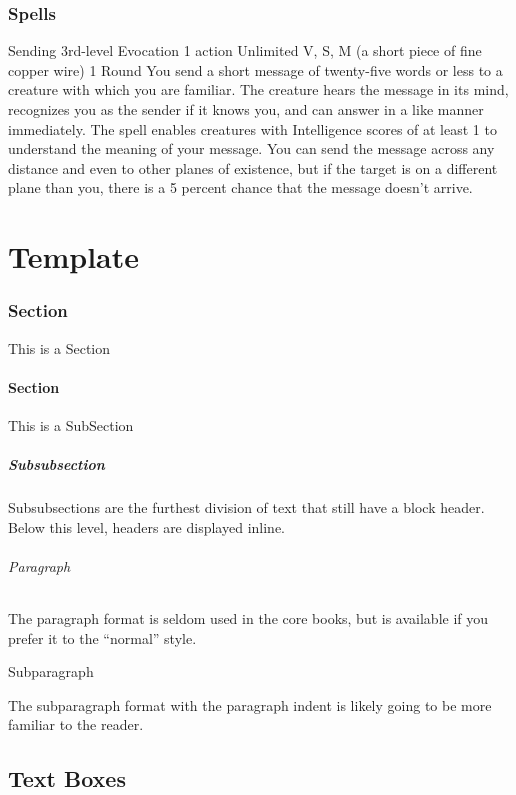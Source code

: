 \documentclass[letterpaper,twocolumn,openany,nodeprecatedcode]{dndbook}
\begin{document}
\section{Spells}
\DndSpellHeader%
  {Sending}
  {3rd-level Evocation}
  {1 action}
  {Unlimited}
  {V, S, M (a short piece of fine copper wire)}
  {1 Round}
        You send a short message of twenty-five words or less to a creature with which you are familiar. The creature hears the message in its mind, recognizes you as the sender if it knows you, and can answer in a like manner immediately. The spell enables creatures with Intelligence scores of at least 1 to understand the meaning of your message.
        You can send the message across any distance and even to other planes of existence, but if the target is on a different plane than you, there is a 5 percent chance that the message doesn't arrive.


\part{Template}

\section{Section}
This is a Section

\subsection{Section}
This is a SubSection
\subsubsection{Subsubsection}
Subsubsections are the furthest division of text that still have a block header. Below this level, headers are displayed inline.

\paragraph{Paragraph}
The paragraph format is seldom used in the core books, but is available if you prefer it to the ``normal'' style.
\subparagraph{Subparagraph}
The subparagraph format with the paragraph indent is likely going to be more familiar to the reader.


\chapter{Text Boxes}
\end{document}
